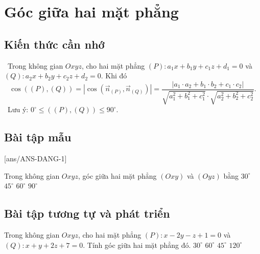 \setcounter{ex}{0}
\section{Góc giữa hai mặt phẳng}
\subsection{Kiến thức cần nhớ}
\begin{khung}
		\faCheckSquareO \, Trong không gian $Oxyz$, cho hai mặt phẳng $(P)\colon a_{1}x+b_{1}y+c_{1}z+d_{1}=0$ và \linebreak $(Q)\colon a_{2}x+b_{2}y+c_{2}z+d_{2}=0$. Khi đó
		\[\cos\left((P), (Q)\right)=\left|\cos\left(\overrightarrow{n}_{(P)}, \overrightarrow{n}_{(Q)}\right)\right|=\dfrac{\left|a_{1}\cdot a_{2}+b_{1}\cdot b_{2}+c_{1}\cdot c_{2}\right|}{\sqrt{a_{1}^{2}+b_{1}^{2}+c_{1}^{2}}\cdot\sqrt{a_{2}^{2}+b_{2}^{2}+c_{2}^{2}}}.\]
		\faCheckSquareO \, Lưu ý: $0^\circ\le \left((P), (Q)\right)\le 90^\circ$.
\end{khung}

\subsection{Bài tập mẫu}
\setcounter{vd}{10}
[ans/ANS-DANG-1]
\begin{khung}
	\begin{vd}%
		Trong không gian $Oxyz$, góc giữa hai mặt phẳng $(Oxy)$ và $(Oyz)$ bằng
		\choice
		{$30^{\circ}$}
		{$45^{\circ}$}
		{$60^{\circ}$}
		{\True $90^{\circ}$}
	\end{vd}
\end{khung}

\subsection{Bài tập tương tự và phát triển}
\begin{ex}%
	Trong không gian $Oxyz$, cho hai mặt phẳng $(P)\colon x-2y-z+1=0$ và \linebreak $(Q)\colon x+y+2z+7=0$. Tính góc giữa hai mặt phẳng đó.
	\choice
	{$30^{\circ}$}
	{\True $60^{\circ}$}
	{$45^{\circ}$}
	{$120^{\circ}$}
\end{ex}

